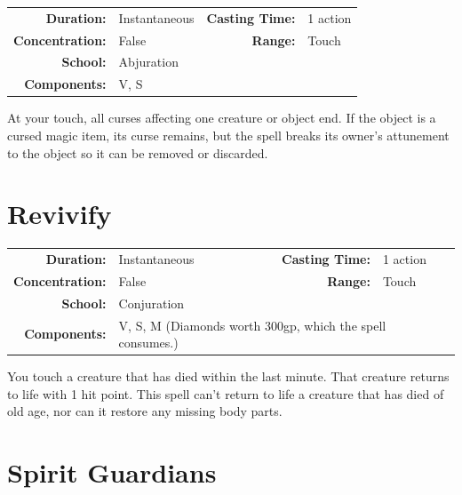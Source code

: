 \documentclass[12pt,showtrims]{memoir}
\begin{document}
{
\small\centering\vspace{-6pt}
\begin{tabular}{rlrl}
\toprule

\textbf{Duration:} & Instantaneous &
\textbf{Casting Time:} & 1 action \\
\textbf{Concentration:} & False &
\textbf{Range:} & Touch \\
\textbf{School:} & Abjuration \\
\textbf{Components:} & \multicolumn{3}{p{0.7\textwidth}}{V, S}\\

\bottomrule
\end{tabular}
}

\vspace{1\baselineskip}\noindent At your touch, all curses affecting one creature or object end. If the object is a cursed magic item, its curse remains, but the spell breaks its owner's attunement to the object so it can be removed or discarded.

\newpage
\section*{Revivify}

{
\small\centering\vspace{-6pt}
\begin{tabular}{rlrl}
\toprule

\textbf{Duration:} & Instantaneous &
\textbf{Casting Time:} & 1 action \\
\textbf{Concentration:} & False &
\textbf{Range:} & Touch \\
\textbf{School:} & Conjuration \\
\textbf{Components:} & \multicolumn{3}{p{0.7\textwidth}}{V, S, M (Diamonds worth 300gp, which the spell consumes.)}\\

\bottomrule
\end{tabular}
}

\vspace{1\baselineskip}\noindent You touch a creature that has died within the last minute. That creature returns to life with 1 hit point. This spell can't return to life a creature that has died of old age, nor can it restore any missing body parts.

\newpage
\section*{Spirit Guardians}
\end{document}
